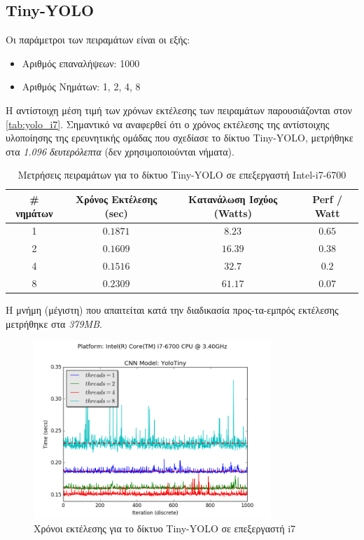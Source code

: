 
\subsection{Tiny-YOLO}

Οι παράμετροι των πειραμάτων είναι οι εξής:
\begin{itemize}
  \item{Αριθμός επαναλήψεων: 1000}
  \item{Αριθμός Νημάτων: 1, 2, 4, 8}
\end{itemize}

Η αντίστοιχη μέση τιμή των χρόνων εκτέλεσης των πειραμάτων παρουσιάζονται στον \autoref{tab:yolo_i7}.
Σημαντικό να αναφερθεί ότι ο χρόνος εκτέλεσης της αντίστοιχης υλοποίησης της ερευνητικής ομάδας
που σχεδίασε το δίκτυο Tiny-YOLO, μετρήθηκε στα \emph{1.096 δευτερόλεπτα} (δεν χρησιμοποιούνται νήματα).

\begin{table}[H]
  \begin{center}
    \caption{Μετρήσεις πειραμάτων για το δίκτυο Tiny-YOLO σε επεξεργαστή Intel-i7-6700}
    \label{tab:yolo_i7}
    \begin{tabular}{ | c | c | c | c | }
      \hline
      \rowcolor{Gray}
      \# νημάτων & Χρόνος Εκτέλεσης (sec) & Κατανάλωση Ισχύος (Watts) & Perf / Watt \\
      \hline
      1 & $0.1871$ & $8.23$ & $0.65$ \\
      2 & $0.1609$ & $16.39$ & $0.38$ \\
      4 & $0.1516$ & $32.7$ & $0.2$ \\
      8 & $0.2309$ & $61.17$ & $0.07$ \\
      \hline
    \end{tabular}
  \end{center}
\end{table}

Η μνήμη (μέγιστη) που απαιτείται κατά την διαδικασία
προς-τα-εμπρός εκτέλεσης μετρήθηκε στα \emph{379MB}.

\begin{figure}[H]
  \centering
  \includegraphics[width=0.8\textwidth]{./images/chapter6/benchmark_yolotiny_i7.png}
  \caption[Χρόνoι εκτέλεσης για το δίκτυο Tiny-YOLO σε επεξεργαστή i7]{Χρόνοι εκτέλεσης για το δίκτυο Tiny-YOLO σε επεξεργαστή i7}
  \label{fig:yolotiny_results_i7}
\end{figure}


